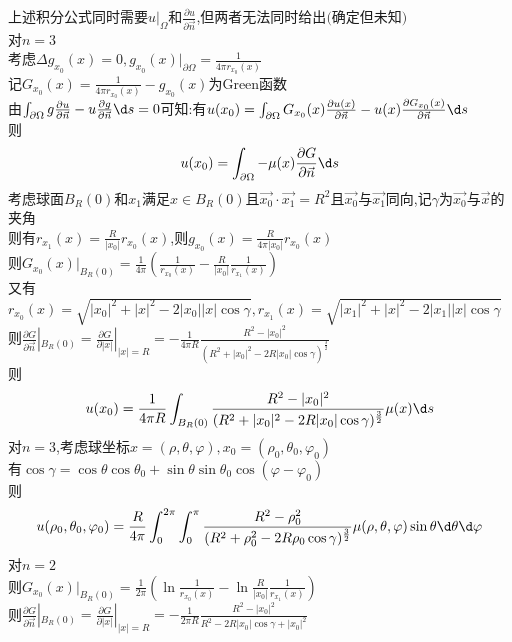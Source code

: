 \begin{jie}
上述积分公式同时需要$u|_{\Omega}$和$\frac{\partial u}{\partial \vec{n}}$,但两者无法同时给出$($确定但未知$)$\\
\hspace*{2em}对$n=3$\\
考虑$\Delta g_{x_0}(x)=0,g_{x_0}(x)|_{\partial \Omega}=\frac{1}{4\pi r_{x_0}(x)}$\\
记$G_{x_0}(x)=\frac{1}{4\pi r_{x_0}(x)}-g_{x_0}(x)$为Green函数\\
由$\int_{\partial \Omega}g\frac{\partial u}{\partial \vec{n}}-u\frac{\partial g}{\partial \vec{n}}\d s=0$可知:有$u(x_0)=\int_{\partial \Omega}G_{x_0}(x)\frac{\partial u(x)}{\partial \vec{n}}-u(x)\frac{\partial G_{x_0}(x)}{\partial \vec{n}}\d s$\\
则\[u(x_0)=\int_{\partial \Omega}-\mu(x)\frac{\partial G}{\partial \vec{n}}\d s\]
考虑球面$B_{R}(0)$和$x_1$满足$x\in B_{R}(0)$且$\vec{x_0}\cdot\vec{x_1}=R^2$且$\vec{x_0}$与$\vec{x_1}$同向,记$\gamma$为$\vec{x_0}$与$\vec{x}$的夹角\\
则有$r_{x_1}(x)=\frac{R}{|x_0|}r_{x_0}(x)$,则$g_{x_0}(x)=\frac{R}{4\pi|x_0|}r_{x_0}(x)$\\
则$G_{x_0}(x)|_{B_{R}(0)}=\frac{1}{4\pi}(\frac{1}{r_{x_0}(x)}-\frac{R}{|x_0|}\frac{1}{r_{x_1}(x)})$\\
又有$r_{x_0}(x)=\sqrt{|x_0|^2+|x|^2-2|x_0||x|\cos\gamma},r_{x_1}(x)=\sqrt{|x_1|^2+|x|^2-2|x_1||x|\cos\gamma}$\\
则$\frac{\partial G}{\partial \vec{n}}|_{B_{R}(0)}=\frac{\partial G}{\partial |x|}|_{|x|=R}=-\frac{1}{4\pi R}\frac{R^2-|x_0|^2}{(R^2+|x_0|^2-2R|x_0|\cos\gamma)^{\frac{3}{2}}}$\\
则\[u(x_0)=\frac{1}{4\pi R}\int_{B_{R}(0)}\frac{R^2-|x_0|^2}{(R^2+|x_0|^2-2R|x_0|\cos\gamma)^{\frac{3}{2}}}\mu(x)\d s\]
对$n=3$,考虑球坐标$x=(\rho,\theta,\varphi),x_0=(\rho_0,\theta_0,\varphi_0)$\\
有$\cos\gamma=\cos\theta\cos\theta_0+\sin\theta\sin\theta_0\cos(\varphi-\varphi_0)$\\
则\[u(\rho_0,\theta_0,\varphi_0)=\frac{R}{4\pi }\int_{0}^{2\pi}\int_{0}^{\pi}\frac{R^2-\rho_0^2}{(R^2+\rho_0^2-2R\rho_0\cos\gamma)^{\frac{3}{2}}}\mu(\rho,\theta,\varphi)\sin\theta \d\theta\d\varphi\]
\hspace*{2em}对$n=2$\\
则$G_{x_0}(x)|_{B_{R}(0)}=\frac{1}{2\pi}(\ln \frac{1}{r_{x_0}(x)}-\ln \frac{R}{|x_0|}\frac{1}{r_{x_1}(x)})$\\
则$\frac{\partial G}{\partial \vec{n}}|_{B_{R}(0)}=\frac{\partial G}{\partial |x|}|_{|x|=R}=-\frac{1}{2\pi R}\frac{R^2-|x_0|^2}{R^2-2R|x_0|\cos \gamma+|x_0|^2}$\\

\end{jie}

